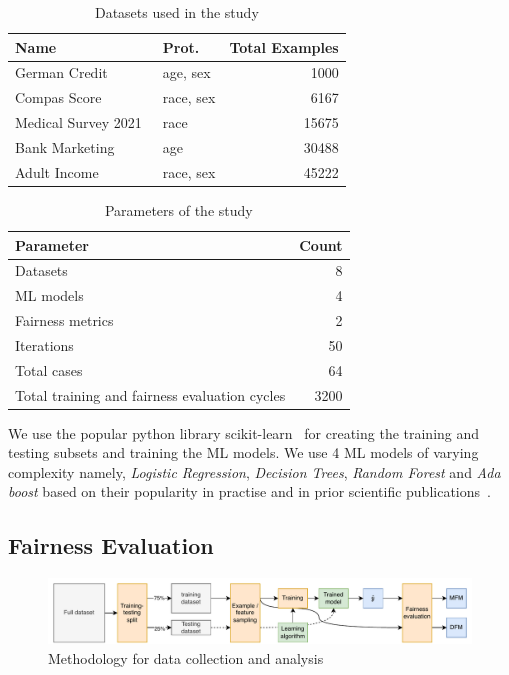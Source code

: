 \documentclass{article}
\begin{document}
\begin{table}
  \centering
  \caption{Datasets used in the study}
  \begin{tabular}{l l r}
    \toprule
    \textbf{Name} & \textbf{Prot.} & \textbf{Total Examples}\\
    \midrule
    German Credit \cite{hofmann1994german} & age, sex & 1000\\
    Compas Score \cite{angwin2016machine} & race, sex & 6167\\
    Medical Survey 2021 \cite{mepsdata} & race & 15675\\
    Bank Marketing \cite{moro2014data} & age & 30488\\
    Adult Income \cite{kohavi1996scaling} & race, sex & 45222\\
    \bottomrule
  \end{tabular}
  \label{tab:datasets}
\end{table}

\begin{table}
  \centering
  \caption{Parameters of the study}
  \begin{tabular}{lr}
    \toprule
    \textbf{Parameter} & \textbf{Count}\\
    \midrule
    Datasets & 8\\
    ML models & 4\\
    Fairness metrics & 2\\
    Iterations & 50\\
    Total cases & 64\\
    Total training and fairness evaluation cycles & 3200\\
    \bottomrule
  \end{tabular}
  \label{tab:parameters}
\end{table}

We use the popular python library scikit-learn \cite{sklearn} for
creating the training and testing subsets and training the ML models.
We use 4 ML models of varying complexity namely, \emph{Logistic
Regression}, \emph{Decision Trees}, \emph{Random Forest} and \emph{Ada
boost} based on their popularity in practise and in prior scientific
publications \cite{CITEME}.

\subsection{Fairness Evaluation}\label{sec:method-fair-eval}

\begin{figure}
  \centering
  \includegraphics[width=0.95\linewidth]{method.pdf}
  \caption{Methodology for data collection and analysis}
  \label{fig:method}
\end{figure}
\end{document}
